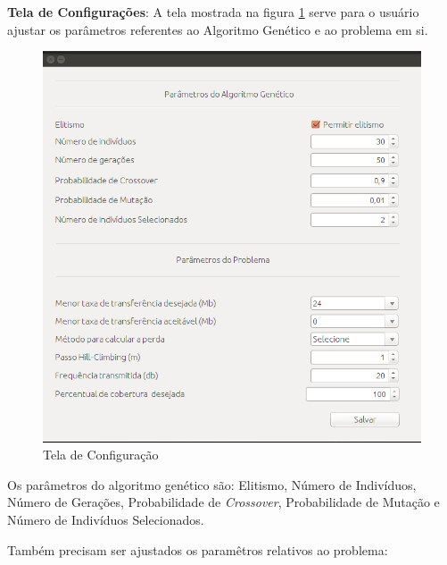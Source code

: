 \documentclass[tc,twoside]{iiufrgs}
\begin{document}
\textbf{Tela de Configurações}: A tela mostrada na figura \ref{fig:telaConfiguracoes} serve para o usuário ajustar os parâmetros referentes ao Algoritmo Genético e ao problema em si. 

\begin{figure}[!h]
	\centering
	\includegraphics[scale=0.4]{img/tela_configuracao.png}
	\caption{Tela de Configuração}
	\label{fig:telaConfiguracoes}
\end{figure}

Os parâmetros do algoritmo genético são:
Elitismo, Número de Indivíduos, Número de Gerações, Probabilidade de \textit{Crossover}, Probabilidade de Mutação e Número de Indivíduos Selecionados.

Também precisam ser ajustados os paramêtros relativos ao problema:
\end{document}

